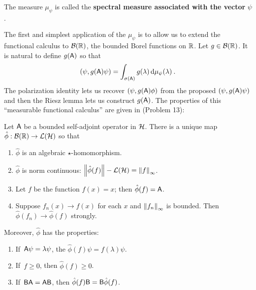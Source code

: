 \begin{definition}
    The measure $\mu_\psi$ is called the \textbf{spectral measure associated with the vector} $\psi$.
\end{definition}

The first and simplest application of the $\mu_\psi$ is to allow us to extend the functional calculus to $\mathcal B(\mathbb{R})$, the bounded Borel functions on $\mathbb{R}$. Let $g \in \mathcal B(\mathbb{R})$. It is natural to define $g(\mathsf{A})$ so that 
\begin{align}
    (\psi, g(\mathsf{A}) \psi) = \int_{\sigma (\mathsf{A})} g(\lambda) \, \mathrm{d} \mu_\psi (\lambda) \:.
\end{align}
The polarization identity lets us recover $(\psi, g(\mathsf{A}) \phi)$ from the proposed $(\psi, g(\mathsf{A}) \psi)$ and then the Riesz lemma lets us construct $g(\mathsf{A})$. The properties of this \enquote{measurable functional calculus} are given in (Problem 13):

\begin{theorem}
    Let $\mathsf{A}$ be a bounded self-adjoint operator in $\mathcal{H}$. There is a unique map $\hat \phi: \mathcal B(\mathbb{R}) \to \mathcal L (\mathcal{H})$ so that \begin{enumerate}
        \item $\hat \phi$ is an algebraic $\star$-homomorphism.
        \item $\hat \phi$ is norm continuous: $\left \Vert \hat \phi (f) \right \Vert-{\mathcal L(\mathcal{H})} = \left \Vert f \right \Vert_\infty$.
        \item Let $f$ be the function $f(x) = x $; then $\hat \phi(f) = \mathsf{A}$.
        \item Suppose $f_n(x) \rightarrow f(x)$ for each $x$ and $\left \Vert f_n \right \Vert_\infty$ is bounded. Then $\hat \phi(f_n) \rightarrow \hat \phi (f)$ strongly.
    \end{enumerate}
    
    Moreover, $\hat \phi$ has the properties:
    \begin{enumerate}
        \item If\, $\mathsf{A} \psi = \lambda \psi$, the $\hat \phi(f) \psi = f(\lambda) \psi$.
        \item If\, $f \geq 0$, then $\hat \phi (f) \geq 0$.
        \item If\, $\mathsf{B} \mathsf{A} = \mathsf{A} \mathsf{B}$, then $\hat \phi (f) \mathsf{B} = \mathsf{B} \hat \phi(f)$.
    \end{enumerate}
\end{theorem}

